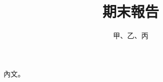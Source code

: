 \documentclass[lang=zh]{akizumi-hw}
\title{期末報告}
\author{甲、乙、丙}
\begin{document}
\maketitle
內文。
\end{document}
